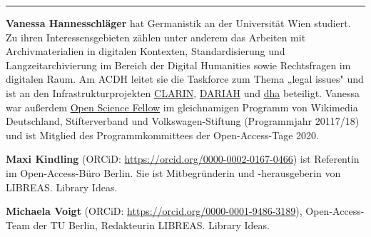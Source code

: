 \begin{center}\rule{0.5\linewidth}{0.5pt}\end{center}

\textbf{Vanessa Hannesschläger} hat Germanistik an der Universität Wien
studiert. Zu ihren Interessensgebieten zählen unter anderem das Arbeiten
mit Archivmaterialien in digitalen Kontexten, Standardisierung und
Langzeitarchivierung im Bereich der Digital Humanities sowie
Rechtsfragen im digitalen Raum. Am ACDH leitet sie die Taskforce zum
Thema „legal issues" und ist an den Infrastrukturprojekten
\href{https://www.oeaw.ac.at/de/acdh/projects/clarin/}{CLARIN},
\href{https://www.oeaw.ac.at/de/acdh/projects/dariah-eu/}{DARIAH} und
\href{https://www.oeaw.ac.at/de/acdh/projects/dha-digital-humanities-austria/}{dha}
beteiligt. Vanessa war außerdem
\href{https://en.wikiversity.org/wiki/Wikimedia_Deutschland/Open_Science_Fellows_Program}{Open
Science Fellow} im gleichnamigen Programm von Wikimedia Deutschland,
Stifterverband und Volkswagen-Stiftung (Programmjahr 20117/18) und ist
Mitglied des Programmkommittees der Open-Access-Tage 2020.

\textbf{Maxi Kindling} (ORCiD:
\url{https://orcid.org/0000-0002-0167-0466}) ist Referentin im
Open-Access-Büro Berlin. Sie ist Mitbegründerin und -herausgeberin von
LIBREAS. Library Ideas.

\textbf{Michaela Voigt} (ORCiD:
\url{https://orcid.org/0000-0001-9486-3189}), Open-Access-Team der TU
Berlin, Redakteurin LIBREAS. Library Ideas.
